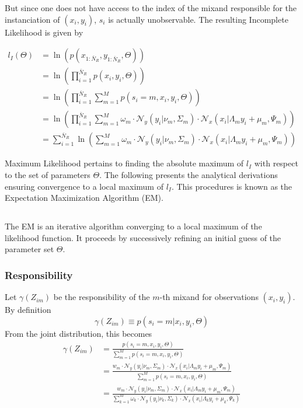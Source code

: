 But since one does not have access to the index of the mixand responsible for the instanciation of $(x_i,y_i)$, $s_i$ is actually unobservable. The resulting Incomplete Likelihood is given by

\begin{align}
l_I(\Theta)& = \ln\left(p(x_{1:\bar{N}_R},y_{1:\bar{N}_R},\Theta)\right)\nonumber\\
&=  \ln\left(\prod\limits_{i = 1}^{\bar{N}_R}p(x_i,y_i,\Theta)\right)\nonumber\\
&= \ln\left(\prod\limits_{i = 1}^{\bar{N}_R}\sum\limits_{m = 1}^{M}p(s_i = m,x_i,y_i,\Theta)\right)\nonumber\\
&= \ln\left(\prod\limits_{i = 1}^{\bar{N}_R}\sum\limits_{m = 1}^{M}\omega_m\cdot
\mathcal{N}_y\left(y_i\vert\nu_m,\Sigma_m\right)\cdot\mathcal{N}_x\left(x_i\vert\Lambda_my_i + \mu_m,\Psi_m\right)\right)\\
&=\sum\limits_{i = 1}^{\bar{N}_R}\ln\left(\sum\limits_{m = 1}^{M}\omega_m\cdot
\mathcal{N}_y\left(y_i\vert\nu_m,\Sigma_m\right)\cdot\mathcal{N}_x\left(x_i\vert\Lambda_my_i + \mu_m,\Psi_m\right)\right)
\end{align}

Maximum Likelihood pertains to finding the absolute maximum of $l_I$ with respect to the set of parameters $\Theta$. The following presents the analytical derivations ensuring convergence to a local maximum of $l_I$. This procedures is known as the Expectation Maximization Algorithm (EM).
\subsection{}
The EM is an iterative algorithm converging to a local maximum of the likelihood function. It proceeds by successively refining an initial guess of the parameter set $\Theta$. 

\subsubsection{Responsibility}
Let $\gamma(Z_{im})$ be the responsibility of the $m$-th mixand for observations $(x_i,y_i)$. By definition
\begin{equation}
 \gamma(Z_{im})\equiv p(s_i = m\vert x_i,y_i,\Theta)
\end{equation}
From the joint distribution, this becomes
\begin{align}
 \gamma(Z_{im})& = \frac{p(s_i = m, x_i, y_i, \Theta)}{\sum\limits_{m = 1}^{M}p(s_i = m, x_i, y_i, \Theta)}\\
 &=  \frac{w_{m}\cdot
\mathcal{N}_y\left(y_i\vert\nu_m,\Sigma_m\right)\cdot\mathcal{N}_x\left(x_i\vert\Lambda_my_i + \mu_m,\Psi_m\right)}{\sum\limits_{m = 1}^{M}p(s_i = m, x_i, y_i, \Theta)}\\
&=  \frac{w_{m}\cdot
\mathcal{N}_y\left(y_i\vert\nu_m,\Sigma_m\right)\cdot\mathcal{N}_x\left(x_i\vert\Lambda_my_i + \mu_m,\Psi_m\right)}{\sum\limits_{k = 1}^{M}\omega_k\cdot
\mathcal{N}_y\left(y_i\vert\nu_k,\Sigma_k\right)\cdot\mathcal{N}_x\left(x_i\vert\Lambda_ky_i + \mu_k,\Psi_k\right) }
\end{align}

